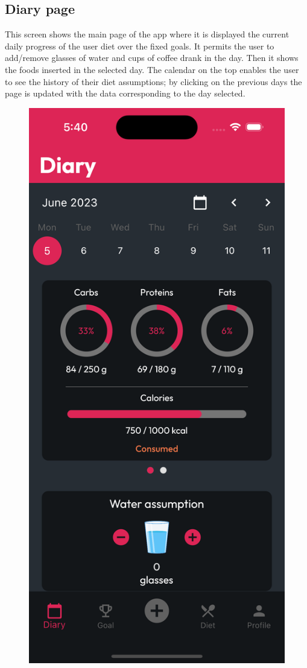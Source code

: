 \documentclass{Configuration_Files/PoliMi3i_thesis}
\begin{document}
\subsection{Diary page}
\begin{minipage}{\linewidth}
    This screen shows the main page of the app where it is displayed the current daily progress of the user diet over the fixed goals. It permits the user to add/remove glasses of water and cups of coffee drank in the day. Then it shows the foods inserted in the selected day.
    The calendar on the top enables the user to see the history of their diet assumptions; by clicking on the previous days the page is updated with the data corresponding to the day selected.
\end{minipage}

\begin{figure}[!h]
    \centering
    \includegraphics[scale=0.1]{Images/Screenshots/Mobile/Diary1.png}

\end{figure}
\end{document}
